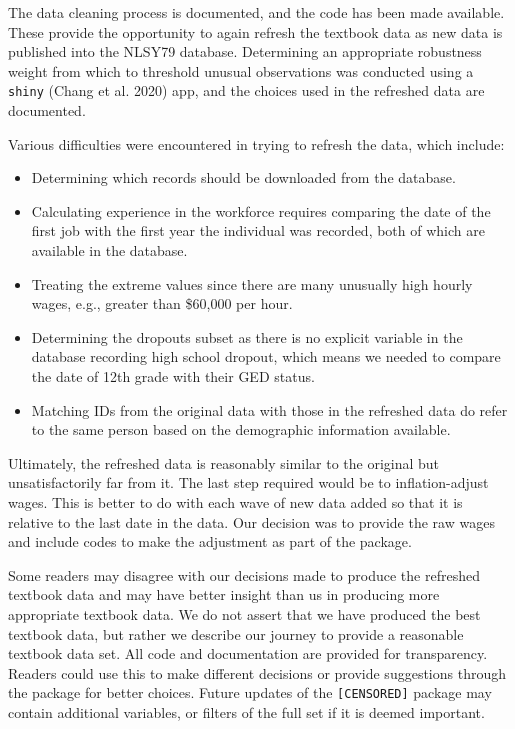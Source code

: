 \documentclass[12pt]{article}
\providecommand{\tightlist}{%
  \setlength{\itemsep}{0pt}\setlength{\parskip}{0pt}}
\begin{document}
The data cleaning process is documented, and the code has been made available. These provide the opportunity to again refresh the textbook data as new data is published into the NLSY79 database.
Determining an appropriate robustness weight from which to threshold unusual observations was conducted using a \texttt{shiny} (Chang et al. 2020) app, and the choices used in the refreshed data are documented.

Various difficulties were encountered in trying to refresh the data, which include:

\begin{itemize}
\tightlist
\item
  Determining which records should be downloaded from the database.
\item
  Calculating experience in the workforce requires comparing the date of the first job with the first year the individual was recorded, both of which are available in the database.
\item
  Treating the extreme values since there are many unusually high hourly wages, e.g., greater than \$60,000 per hour.
\item
  Determining the dropouts subset as there is no explicit variable in the database recording high school dropout, which means we needed to compare the date of 12th grade with their GED status.
\item
  Matching IDs from the original data with those in the refreshed data do refer to the same person based on the demographic information available.
\end{itemize}

Ultimately, the refreshed data is reasonably similar to the original but unsatisfactorily far from it. The last step required would be to inflation-adjust wages. This is better to do with each wave of new data added so that it is relative to the last date in the data. Our decision was to provide the raw wages and include codes to make the adjustment as part of the package.

Some readers may disagree with our decisions made to produce the refreshed textbook data and may have better insight than us in producing more appropriate textbook data. We do not assert that we have produced the best textbook data, but rather we describe our journey to provide a reasonable textbook data set. All code and documentation are provided for transparency. Readers could use this to make different decisions or provide suggestions through the package for better choices. Future updates of the \texttt{[CENSORED]} package may contain additional variables, or filters of the full set if it is deemed important.
\end{document}
